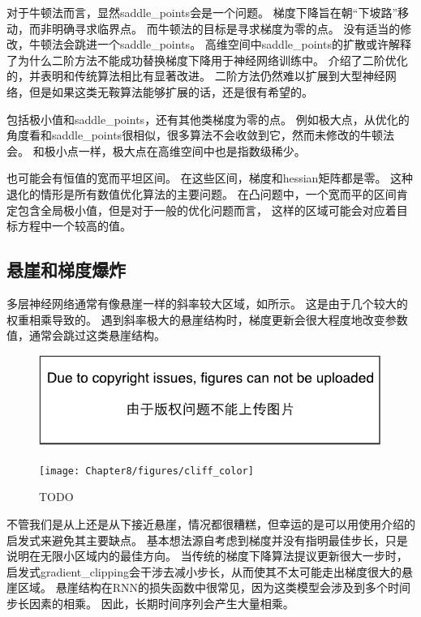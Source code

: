 对于牛顿法而言，显然\gls{saddle_points}会是一个问题。
梯度下降旨在朝``下坡路''移动，而非明确寻求临界点。
而牛顿法的目标是寻求梯度为零的点。
没有适当的修改，牛顿法会跳进一个\gls{saddle_points}。
高维空间中\gls{saddle_points}的扩散或许解释了为什么二阶方法不能成功替换梯度下降用于神经网络训练中。
\cite{Dauphin-et-al-NIPS2014-small}介绍了二阶优化的，并表明和传统算法相比有显著改进。
二阶方法仍然难以扩展到大型神经网络，但是如果这类无鞍算法能够扩展的话，还是很有希望的。


包括极小值和\gls{saddle_points}，还有其他类梯度为零的点。
例如极大点，从优化的角度看和\gls{saddle_points}很相似，很多算法不会收敛到它，然而未修改的牛顿法会。
和极小点一样，极大点在高维空间中也是指数级稀少。

也可能会有恒值的宽而平坦区间。
在这些区间，梯度和\gls{hessian}矩阵都是零。
这种退化的情形是所有数值优化算法的主要问题。
在凸问题中，一个宽而平的区间肯定包含全局极小值，但是对于一般的优化问题而言，
这样的区域可能会对应着目标方程中一个较高的值。


\subsection{悬崖和梯度爆炸}
\label{sec:cliffs_and_exploding_gradients}
多层神经网络通常有像悬崖一样的斜率较大区域，如所示。
这是由于几个较大的权重相乘导致的。
遇到斜率极大的悬崖结构时，梯度更新会很大程度地改变参数值，通常会跳过这类悬崖结构。

\begin{figure}[!htb]
\ifOpenSource
\centerline{\includegraphics{figure.pdf}}
\else
\centerline{\texttt{[image: Chapter8/figures/cliff\_color]}}
\fi
\caption{TODO}
\label{fig:chap8_cliff}
\end{figure}


不管我们是从上还是从下接近悬崖，情况都很糟糕，但幸运的是可以用使用介绍的启发式来避免其主要缺点。
基本想法源自考虑到梯度并没有指明最佳步长，只是说明在无限小区域内的最佳方向。
当传统的梯度下降算法提议更新很大一步时，启发式\gls{gradient_clipping}会干涉去减小步长，从而使其不太可能走出梯度很大的悬崖区域。
悬崖结构在\gls{RNN}的损失函数中很常见，因为这类模型会涉及到多个时间步长因素的相乘。
因此，长期时间序列会产生大量相乘。

